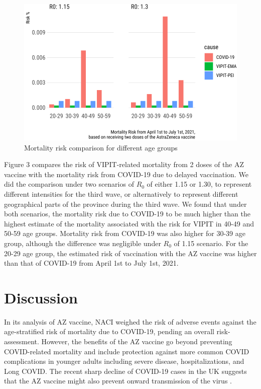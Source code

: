 \documentclass[]{interact}
\theoremstyle{plain}%
\theoremstyle{definition}
\theoremstyle{remark}
\begin{document}
\begin{figure}

{\centering \includegraphics[width=0.7\linewidth]{theCaseforAZ_files/figure-latex/covidvsvipit-1} 

}

\caption{Mortality risk comparison for different age groups}\label{fig:covidvsvipit}
\end{figure}

Figure 3 compares the risk of VIPIT-related mortality from 2 doses of
the AZ vaccine with the mortality risk from COVID-19 due to delayed
vaccination. We did the comparison under two scenarios of \(R_0\) of
either 1.15 or 1.30, to represent different intensities for the third
wave, or alternatively to represent different geographical parts of the
province during the third wave. We found that under both scenarios, the
mortality risk due to COVID-19 to be much higher than the highest
estimate of the mortality associated with the risk for VIPIT in 40-49
and 50-59 age groups. Mortality risk from COVID-19 was also higher for
30-39 age group, although the difference was negligible under \(R_0\) of
1.15 scenario. For the 20-29 age group, the estimated risk of
vaccination with the AZ vaccine was higher than that of COVID-19 from
April 1st to July 1st, 2021.

\hypertarget{discussion}{%
\section{Discussion}\label{discussion}}

In its analysis of AZ vaccine, NACI weighed the risk of adverse events
against the age-stratified risk of mortality due to COVID-19, pending an
overall risk-assessment. However, the benefits of the AZ vaccine go
beyond preventing COVID-related mortality and include protection against
more common COVID complications in younger adults including severe
disease, hospitalizations, and Long COVID. The recent sharp decline of
COVID-19 cases in the UK suggests that the AZ vaccine might also prevent
onward transmission of the virus
\citep{our_world_in_data_covid-19_2021}.
\end{document}
